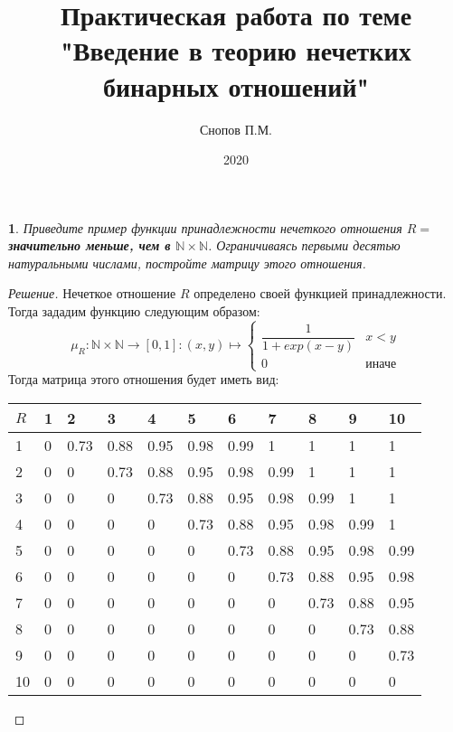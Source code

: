 \documentclass[11pt,a4paper,oneside]{article}
\title{Практическая работа по теме "Введение в теорию нечетких бинарных отношений"}
\date{2020}
\author{Снопов П.М.}
\newenvironment{problem}{
	\medskip
	\begin{problem-internal}
	}{
	\end{problem-internal}
}
\newenvironment{solution}{
	\begin{proof}[Решение]
		\vspace{-8px}
		\setlength{\parskip}{4px}
		\setlength{\parindent}{0px}
	}{
	\end{proof}
}
\newtheorem{problem-internal}{}
\begin{document}
	\maketitle
	
	\begin{problem}
		Приведите пример функции принадлежности нечеткого отношения $R =$ { \bf значительно меньше, чем в $\mathbb{N} \times \mathbb{N}$}. Ограничиваясь первыми десятью натуральными числами, постройте матрицу этого отношения.
	\end{problem}

	\begin{solution}
		Нечеткое отношение $R$ определено своей функцией принадлежности. Тогда зададим функцию следующим образом: 
		\[\mu_R: \mathbb{N} \times \mathbb{N} \to [0,1]: (x,y) \mapsto \begin{cases}
		\dfrac{1}{1 + exp(x-y)} & x < y \\
		0 & \text{иначе}
		\end{cases}
		\]
		Тогда матрица этого отношения будет иметь вид:
		\begin{table}[h!]
			\begin{tabular}{|l|l|l|l|l|l|l|l|l|l|l|}
				\hline
				$R$& 1 & 2    & 3    & 4    & 5    & 6    & 7    & 8    & 9    & 10   \\ \hline
				1  & 0 & 0.73 & 0.88 & 0.95 & 0.98 & 0.99 & 1    & 1    & 1    & 1    \\ \hline
				2  & 0 & 0    & 0.73 & 0.88 & 0.95 & 0.98 & 0.99 & 1    & 1    & 1    \\ \hline
				3  & 0 & 0    & 0    & 0.73 & 0.88 & 0.95 & 0.98 & 0.99 & 1    & 1    \\ \hline
				4  & 0 & 0    & 0    & 0    & 0.73 & 0.88 & 0.95 & 0.98 & 0.99 & 1    \\ \hline
				5  & 0 & 0    & 0    & 0    & 0    & 0.73 & 0.88 & 0.95 & 0.98 & 0.99 \\ \hline
				6  & 0 & 0    & 0    & 0    & 0    & 0    & 0.73 & 0.88 & 0.95 & 0.98 \\ \hline
				7  & 0 & 0    & 0    & 0    & 0    & 0    & 0    & 0.73 & 0.88 & 0.95 \\ \hline
				8  & 0 & 0    & 0    & 0    & 0    & 0    & 0    & 0    & 0.73 & 0.88 \\ \hline
				9  & 0 & 0    & 0    & 0    & 0    & 0    & 0    & 0    & 0    & 0.73 \\ \hline
				10 & 0 & 0    & 0    & 0    & 0    & 0    & 0    & 0    & 0    & 0    \\ \hline
			\end{tabular}
		\end{table}
	
	\end{solution}
\end{document}
